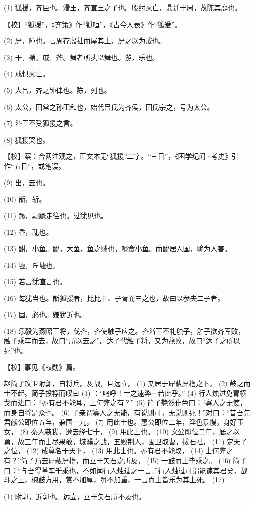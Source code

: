 \documentclass[12pt,UTF8]{ctexbook}
\begin{document}
(1) 狐援，齐臣也。湣王，齐宣王之子也。殷纣灭亡，鼎迁于周，故陈其庭也。

【校】“狐援”，《齐策》作“狐咺”，《古今人表》作“狐爰”。

(2) 屏，障也。言周存殷社而屋其上，屏之以为戒也。

(3) 干，楯。戚，斧。舞者所执以舞也。游，乐也。

(4) 戒惧灭亡。

(5) 大吕，齐之钟律也。陈，列也。

(6) 太公，田常之孙田和也，始代吕氏为齐侯，田氏宗之，号为太公。

(7) 湣王不受狐援之言。

(8) 狐援哭也。

【校】案：合两注观之，正文本无“狐援”二字。“三日”，《困学纪闻·考史》引作“五日”，或笔误。

(9) 出，去也。

(10) 斮，斩。

(11) 蹶，颠蹶走往也。过犹见也。

(12) 昏，乱也。

(13) 鲋，小鱼。鲵，大鱼，鱼之贼也，啖食小鱼。而鲵居人国，喻为人害。

(14) 墟，丘墟也。

(15) 若言犹直言也。

(16) 每犹当也。斮狐援者，比比干、子胥而三之也，故曰以参夫二子者。

(17) 固，必也。嫌犹近也。

(18) 乐毅为燕昭王将，伐齐，齐使触子应之。齐湣王不礼触子，触子欲齐军败，触子乘车而去，故曰“所以去之”。达子代触子将，又为燕败，故曰“达子之所以死”也。

【校】事见《权勋》篇。

赵简子攻卫附郭，自将兵，及战，且远立， (1) 又居于犀蔽屏橹之下， (2) 鼓之而士不起。简子投桴而叹曰 (3) ：“呜呼！士之速弊一若此乎。” (4) 行人烛过免胄横戈而进曰：“亦有君不能耳，士何弊之有？” (5) 简子艴然作色曰：“寡人之无使，而身自将是众也。 (6) 子亲谓寡人之无能，有说则可，无说则死！”对曰：“昔吾先君献公即位五年，兼国十九， (7) 用此士也。惠公即位二年，淫色暴慢，身好玉女， (8) 秦人袭我，逊去绛七十， (9) 用此士也。 (10) 文公即位二年，厎之以勇，故三年而士尽果敢，城濮之战，五败荆人，围卫取曹，拔石社， (11) 定天子之位， (12) 成尊名于天下， (13) 用此士也。亦有君不能取， (14) 士何弊之有？”简子乃去犀蔽屏橹，而立于矢石之所及， (15) 一鼓而士毕乘之。 (16) 简子曰：“与吾得革车千乘也，不如闻行人烛过之一言。”行人烛过可谓能谏其君矣，战斗之上，枹鼓方用，赏不加厚，罚不加重，一言而士皆乐为其上死。 (17)

(1) 附郭，近郭也。远立，立于矢石所不及也。
\end{document}
